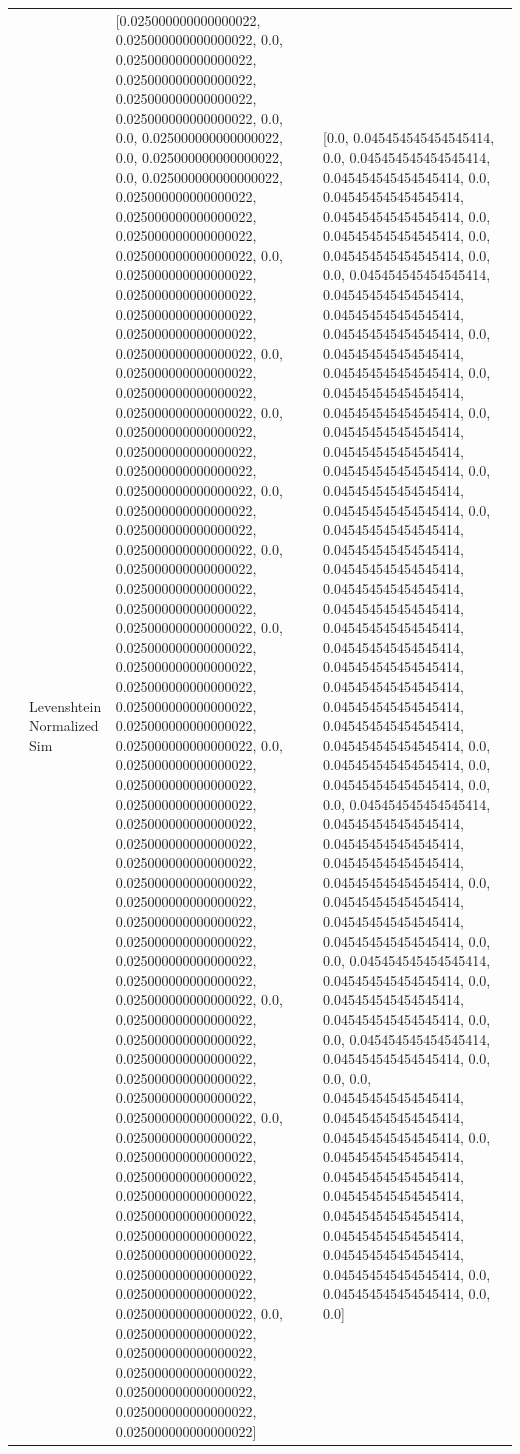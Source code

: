 \begin{tabular}{llll}
 & Levenshtein Normalized Sim & [0.025000000000000022, 0.025000000000000022, 0.0, 0.025000000000000022, 0.025000000000000022, 0.025000000000000022, 0.025000000000000022, 0.0, 0.0, 0.025000000000000022, 0.0, 0.025000000000000022, 0.0, 0.025000000000000022, 0.025000000000000022, 0.025000000000000022, 0.025000000000000022, 0.025000000000000022, 0.0, 0.025000000000000022, 0.025000000000000022, 0.025000000000000022, 0.025000000000000022, 0.025000000000000022, 0.0, 0.025000000000000022, 0.025000000000000022, 0.025000000000000022, 0.0, 0.025000000000000022, 0.025000000000000022, 0.025000000000000022, 0.025000000000000022, 0.0, 0.025000000000000022, 0.025000000000000022, 0.025000000000000022, 0.0, 0.025000000000000022, 0.025000000000000022, 0.025000000000000022, 0.025000000000000022, 0.0, 0.025000000000000022, 0.025000000000000022, 0.025000000000000022, 0.025000000000000022, 0.025000000000000022, 0.025000000000000022, 0.0, 0.025000000000000022, 0.025000000000000022, 0.025000000000000022, 0.025000000000000022, 0.025000000000000022, 0.025000000000000022, 0.025000000000000022, 0.025000000000000022, 0.025000000000000022, 0.025000000000000022, 0.025000000000000022, 0.025000000000000022, 0.025000000000000022, 0.0, 0.025000000000000022, 0.025000000000000022, 0.025000000000000022, 0.025000000000000022, 0.025000000000000022, 0.025000000000000022, 0.0, 0.025000000000000022, 0.025000000000000022, 0.025000000000000022, 0.025000000000000022, 0.025000000000000022, 0.025000000000000022, 0.025000000000000022, 0.025000000000000022, 0.025000000000000022, 0.025000000000000022, 0.0, 0.025000000000000022, 0.025000000000000022, 0.025000000000000022, 0.025000000000000022, 0.025000000000000022, 0.025000000000000022] & [0.0, 0.045454545454545414, 0.0, 0.045454545454545414, 0.045454545454545414, 0.0, 0.045454545454545414, 0.045454545454545414, 0.0, 0.045454545454545414, 0.0, 0.045454545454545414, 0.0, 0.0, 0.045454545454545414, 0.045454545454545414, 0.045454545454545414, 0.045454545454545414, 0.0, 0.045454545454545414, 0.045454545454545414, 0.0, 0.045454545454545414, 0.045454545454545414, 0.0, 0.045454545454545414, 0.045454545454545414, 0.045454545454545414, 0.0, 0.045454545454545414, 0.045454545454545414, 0.0, 0.045454545454545414, 0.045454545454545414, 0.045454545454545414, 0.045454545454545414, 0.045454545454545414, 0.045454545454545414, 0.045454545454545414, 0.045454545454545414, 0.045454545454545414, 0.045454545454545414, 0.045454545454545414, 0.045454545454545414, 0.0, 0.045454545454545414, 0.0, 0.045454545454545414, 0.0, 0.0, 0.045454545454545414, 0.045454545454545414, 0.045454545454545414, 0.045454545454545414, 0.045454545454545414, 0.0, 0.045454545454545414, 0.045454545454545414, 0.045454545454545414, 0.0, 0.0, 0.045454545454545414, 0.045454545454545414, 0.0, 0.045454545454545414, 0.045454545454545414, 0.0, 0.0, 0.045454545454545414, 0.045454545454545414, 0.0, 0.0, 0.0, 0.045454545454545414, 0.045454545454545414, 0.045454545454545414, 0.0, 0.045454545454545414, 0.045454545454545414, 0.045454545454545414, 0.045454545454545414, 0.045454545454545414, 0.045454545454545414, 0.045454545454545414, 0.0, 0.045454545454545414, 0.0, 0.0] \\

\end{tabular}
